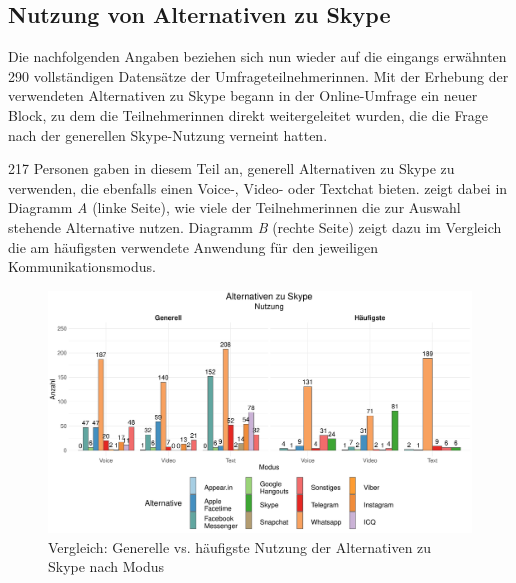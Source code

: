 
\subsection{Nutzung von Alternativen zu Skype}

\label{K6:sub:Nutzung-Alternativen}


 Die nachfolgenden Angaben beziehen sich nun wieder auf die eingangs erwähnten 290 vollständigen Datensätze der Umfrageteilnehmer{\textperiodcentered}innen. Mit der Erhebung der verwendeten Alternativen zu Skype begann in der Online-Umfrage ein neuer Block, zu dem die Teilnehmer{\textperiodcentered}innen direkt weitergeleitet wurden, die die Frage nach der generellen Skype-Nutzung verneint hatten.

217 Personen gaben in diesem Teil an, generell Alternativen zu Skype zu verwenden, die ebenfalls einen Voice-, Video- oder Textchat bieten.  zeigt dabei in Diagramm \emph{A} (linke Seite), wie viele der Teilnehmer{\textperiodcentered}innen die zur Auswahl stehende Alternative nutzen. Diagramm \emph{B} (rechte Seite) zeigt dazu im Vergleich die am häufigsten verwendete Anwendung für den jeweiligen Kommunikationsmodus.


\begin{figure}
	\includegraphics[width=\textwidth]{Figures/Umfrage/GGplot/ggplot_skype_Nutzungsvergleich_Alternativen}
	\caption{Vergleich: Generelle vs. häufigste Nutzung der Alternativen zu Skype nach Modus}
	\label{K6:fig:NutzungsVgl_Alternativen-Modus}
\end{figure}

